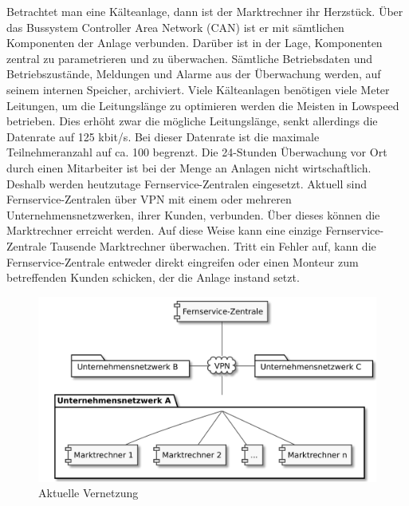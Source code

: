 \documentclass[11pt,a4paper]{report}
\begin{document}
Betrachtet man eine Kälteanlage, dann ist der Marktrechner ihr Herzstück. Über das Bussystem Controller Area Network (CAN) ist er mit sämtlichen Komponenten der Anlage verbunden. Darüber ist in der Lage, Komponenten zentral zu parametrieren und zu überwachen. Sämtliche Betriebsdaten und Betriebszustände, Meldungen und Alarme aus der Überwachung werden, auf seinem internen Speicher, archiviert. Viele Kälteanlagen benötigen viele Meter Leitungen, um die Leitungslänge zu optimieren werden die Meisten in Lowspeed betrieben. Dies erhöht zwar die mögliche Leitungslänge, senkt allerdings die Datenrate auf 125 kbit/s. Bei dieser Datenrate ist die maximale Teilnehmeranzahl auf ca. 100 begrenzt. Die 24-Stunden Überwachung vor Ort durch einen Mitarbeiter ist bei der Menge an Anlagen nicht wirtschaftlich. Deshalb werden heutzutage Fernservice-Zentralen eingesetzt. Aktuell sind Fernservice-Zentralen über VPN mit einem oder mehreren Unternehmensnetzwerken, ihrer Kunden, verbunden. Über dieses können die Marktrechner erreicht werden. Auf diese Weise kann eine einzige Fernservice-Zentrale Tausende Marktrechner überwachen. Tritt ein Fehler auf, kann die Fernservice-Zentrale entweder direkt eingreifen oder einen Monteur zum betreffenden Kunden schicken, der die Anlage instand setzt.

\begin{figure}[h]
\centering
\includegraphics[scale=0.2]{images/problemfeld.pdf}
\caption{Aktuelle Vernetzung}
\label{fig:current_setup}
\end{figure}
\end{document}
